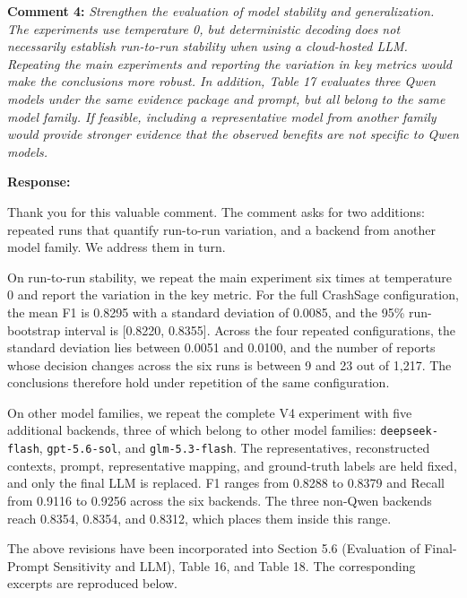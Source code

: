 \documentclass[onecolumn,11pt]{article}
\newcommand{\secc}[2]{\par\mySep \noindent \textsf{\textbf{#1 }}\textit{#2}\par}
\newcommand{\secr}[2]{\par\mySep \noindent \textsf{\textbf{#1 }}{#2}\par}
\newcommand{\mySep}{\vspace{8pt}}
\begin{document}
\secc{Comment 4:}{Strengthen the evaluation of model stability and generalization. The experiments use temperature 0, but deterministic decoding does not necessarily establish run-to-run stability when using a cloud-hosted LLM. Repeating the main experiments and reporting the variation in key metrics would make the conclusions more robust. In addition, Table 17 evaluates three Qwen models under the same evidence package and prompt, but all belong to the same model family. If feasible, including a representative model from another family would provide stronger evidence that the observed benefits are not specific to Qwen models.}
\secr{Response:}{Thank you for this valuable comment. The comment asks for two additions: repeated runs that quantify run-to-run variation, and a backend from another model family. We address them in turn.

On run-to-run stability, we repeat the main experiment six times at temperature 0 and report the variation in the key metric. For the full CrashSage configuration, the mean F1 is 0.8295 with a standard deviation of 0.0085, and the 95\% run-bootstrap interval is [0.8220, 0.8355]. Across the four repeated configurations, the standard deviation lies between 0.0051 and 0.0100, and the number of reports whose decision changes across the six runs is between 9 and 23 out of 1,217. The conclusions therefore hold under repetition of the same configuration.

On other model families, we repeat the complete V4 experiment with five additional backends, three of which belong to other model families: \texttt{deepseek-flash}, \texttt{gpt-5.6-sol}, and \texttt{glm-5.3-flash}. The representatives, reconstructed contexts, prompt, representative mapping, and ground-truth labels are held fixed, and only the final LLM is replaced. F1 ranges from 0.8288 to 0.8379 and Recall from 0.9116 to 0.9256 across the six backends. The three non-Qwen backends reach 0.8354, 0.8354, and 0.8312, which places them inside this range.

The above revisions have been incorporated into Section 5.6 (Evaluation of Final-Prompt Sensitivity and LLM), Table 16, and Table 18. The corresponding excerpts are reproduced below.}
\end{document}
